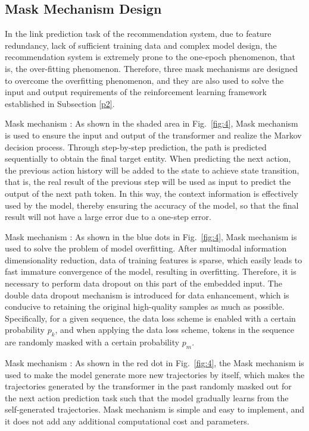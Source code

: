 \documentclass[10pt,journal,compsoc]{IEEEtran}
\begin{document}
\subsection{Mask Mechanism Design}\label{p4}
In the link prediction task of the recommendation system, due to feature redundancy, lack of sufficient training data and complex model design, the recommendation system is extremely prone to the one-epoch phenomenon, that is, the over-fitting phenomenon. Therefore, three mask mechanisms are designed to overcome the overfitting phenomenon, and they are also used to solve the input and output requirements of the reinforcement learning framework established in Subsection \ref{p2}.\par
Mask mechanism  \uppercase\expandafter{}: As shown in the shaded area in Fig.~\ref{fig:4}, Mask mechanism  \uppercase\expandafter{} is used to ensure the input and output of the transformer and realize the Markov decision process. Through step-by-step prediction, the path is predicted sequentially to obtain the final target entity. When predicting the next action, the previous action history will be added to the state to achieve state transition, that is, the real result of the previous step will be used as input to predict the output of the next path token. In this way, the context information is effectively used by the model, thereby ensuring the accuracy of the model, so that the final result will not have a large error due to a one-step error.\par
Mask mechanism  \uppercase\expandafter{}: As shown in the blue dots in Fig.~\ref{fig:4}, Mask mechanism  \uppercase\expandafter{} is used to solve the problem of model overfitting. After multimodal information dimensionality reduction, data of training features is  sparse, which easily leads to  fast immature convergence of the model, resulting in overfitting. Therefore, it is necessary to perform data dropout on this part of the embedded input. The double data dropout mechanism is introduced for data enhancement, which is conducive to retaining the original high-quality samples as much as possible. Specifically, for a given sequence, the data loss scheme is enabled with a certain probability $p_k$, and when applying the data loss scheme, tokens in the sequence are randomly masked with a certain probability $p_m$.\par
Mask mechanism \uppercase\expandafter{}: As shown in the red dot in Fig.~\ref{fig:4}, the Mask mechanism \uppercase\expandafter{} is used to make the model generate more new trajectories by itself, which makes the trajectories generated by the transformer in the past randomly masked out for the next action prediction task such that the model gradually learns from the self-generated trajectories. Mask mechanism \uppercase\expandafter{} is simple and easy to implement, and it does not add any additional computational cost and parameters.\par
\end{document}
